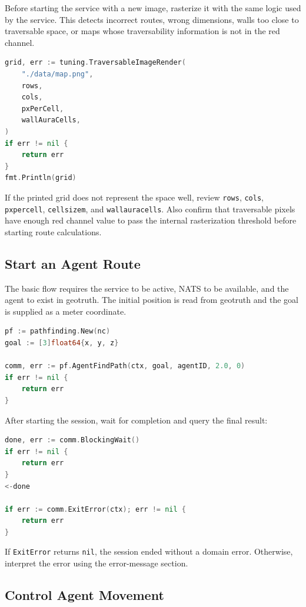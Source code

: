 \documentclass[12pt,a4paper]{report}
\begin{document}
Before starting the service with a new image, rasterize it with the same logic
used by the service. This detects incorrect routes, wrong dimensions, walls too
close to traversable space, or maps whose traversability information is not in
the red channel.

\begin{lstlisting}[language=Go]
grid, err := tuning.TraversableImageRender(
    "./data/map.png",
    rows,
    cols,
    pxPerCell,
    wallAuraCells,
)
if err != nil {
    return err
}
fmt.Println(grid)
\end{lstlisting}

If the printed grid does not represent the space well, review
\texttt{rows}, \texttt{cols}, \texttt{pxpercell}, \texttt{cellsizem}, and
\texttt{wallauracells}. Also confirm that traversable pixels have enough red
channel value to pass the internal rasterization threshold before starting route
calculations.

\subsection{Start an Agent Route}

The basic flow requires the service to be active, NATS to be available, and the
agent to exist in geotruth. The initial position is read from geotruth and the
goal is supplied as a meter coordinate.

\begin{lstlisting}[language=Go]
pf := pathfinding.New(nc)
goal := [3]float64{x, y, z}

comm, err := pf.AgentFindPath(ctx, goal, agentID, 2.0, 0)
if err != nil {
    return err
}
\end{lstlisting}

After starting the session, wait for completion and query the final result:

\begin{lstlisting}[language=Go]
done, err := comm.BlockingWait()
if err != nil {
    return err
}
<-done

if err := comm.ExitError(ctx); err != nil {
    return err
}
\end{lstlisting}

If \texttt{ExitError} returns \texttt{nil}, the session ended without a domain
error. Otherwise, interpret the error using the error-message section.

\subsection{Control Agent Movement}
\end{document}

